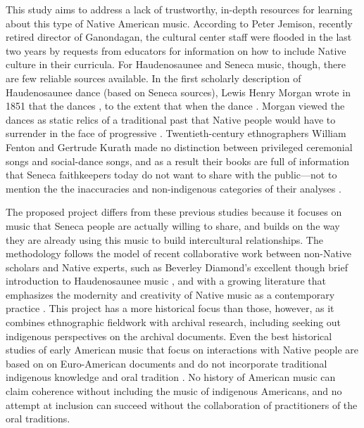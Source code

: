\documentclass{neh}
\begin{document}
This study aims to address a lack of trustworthy, in-depth resources for
learning about this type of Native American music.
According to Peter Jemison, recently retired director of Ganondagan, the
cultural center staff were flooded in the last two years by requests from
educators for information on how to include Native culture in their curricula.
For Haudenosaunee and Seneca music, though, there are few reliable sources
available.
In the first scholarly description of Haudenosaunee dance (based on Seneca
sources), Lewis Henry Morgan wrote in 1851 that the dances , to the extent
that when the dance  
\Autocite[261, 263]{Morgan:League}.
Morgan viewed the dances as static relics of a traditional past that Native
people would have to surrender in the face of progressive
.
Twentieth-century ethnographers William Fenton and Gertrude Kurath made no
distinction between privileged ceremonial songs and social-dance songs, and as
a result their books are full of information that Seneca faithkeepers today do
not want to share with the public---not to mention the the inaccuracies and
non-indigenous categories of their analyses
\Autocites{Fenton:GreatLaw}{FentonKurath:EagleDance}{Kurath:IroquoisMusic}
{Caldwell:Kurath}{McCarthy:Iroquoianist}.

The proposed project differs from these previous studies because it focuses on
music that Seneca people are actually willing to share, and builds on the way
they are already using this music to build intercultural relationships.
The methodology follows the model of recent collaborative work between
non-Native scholars and Native experts, such as Beverley Diamond's excellent
though brief introduction to Haudenosaunee music 
\Autocite{Diamond:NativeAmericanNortheast},
and with a growing literature that emphasizes the modernity and creativity of
Native music as a contemporary practice
\Autocites
{Browner:FirstNations}
{Browner:Heartbeat}
{LevineRobinson:MusicModernity}.
This project has a more historical focus than those, however, as it combines
ethnographic fieldwork with archival research, including seeking out
indigenous perspectives on the archival documents.
Even the best historical studies of early American music that focus on
interactions with Native people are based on on Euro-American documents and
do not incorporate traditional indigenous knowledge and oral tradition 
\Autocites{Goodman:IndianPsalmody}{Eyerly:Moravian}.
No history of American music can claim coherence without including the music
of indigenous Americans, and no attempt at inclusion can succeed without
the collaboration of practitioners of the oral traditions.
\end{document}

